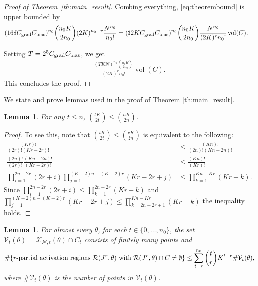 \documentclass{article}
\newtheorem{lemma}[theorem]{Lemma}
\theoremstyle{definition}
\newcommand{\cbias}{C_{\text{\normalfont bias}}}
\newcommand{\cgrad}{C_{\text{\normalfont grad}}}
\newcommand{\nin}{n_0}
\newcommand{\vol}{\operatorname{vol}}
\begin{document}
\begin{proof}[Proof of Theorem~\ref{th:main_result}]
   Combing everything, \eqref{eq:theorembound} is upper bounded by
   \begin{align*}
        &(16 \delta \cgrad \cbias)^{\nin} \binom{\nin K}{2 \nin}  (2 K) ^{\nin - r} \frac{N^{\nin}}{\nin!} = (32 K \cgrad \cbias)^{\nin} \binom{\nin K}{2 \nin}  \frac{N^{\nin}}{ (2 K)^r \nin!} \vol(C).
   \end{align*}
   
   Setting $T
   = 2^5 \cgrad \cbias$, we get
    \begin{align*}
        \frac{(T K N )^{\nin} \binom{\nin K}{2 \nin} } {(2 K)^r \nin!} \vol(C).
    \end{align*}
This concludes the proof. 
\end{proof}

We state and prove lemmas used in the proof of Theorem \ref{th:main_result}. 
\begin{lemma}
    \label{lem:technical1}
    For any $t \leq n$, $\binom{tK}{2t} \leq \binom{nK}{2n}$. 
\end{lemma}
\begin{proof}
To see this, note that $\binom{tK}{2t} \leq \binom{nK}{2n}$ is equivalent to  the following: 
    \begin{align*}
        \frac{(Kr)!}{(2r)!(Kr - 2r)!} &\leq \frac{(Kn)!}{(2n)!(Kn - 2n)!}\\
        \frac{(2n)!}{(2r)!} \frac{(Kn - 2n)!}{(Kr - 2r)!}  &\leq  \frac{(Kn)!}{(Kr)!}\\
        \prod_{i=1}^{2n - 2r} (2r + i) \prod_{j=1}^{(K-2)n - (K-2) r} (Kr - 2r + j) &\leq \prod_{k=1}^{Kn - Kr} (Kr + k). 
    \end{align*}
    Since $\prod_{i=1}^{2n - 2r} (2r + i) \leq \prod_{k=1}^{2n - 2r} (Kr + k)$ and $\prod_{j=1}^{(K-2)n - (K-2) r} (Kr - 2r + j) \leq \prod_{k=2n - 2r + 1}^{Kn - Kr} (Kr + k)$ the inequality holds. 
\end{proof}

\begin{lemma}
    \label{lem:intersection_upper_bound}
    For almost every $\theta$, for each $t\in\{0,\ldots, \nin\}$, the set $\mathcal{V}_t(\theta) = \mathcal{X}_{\mathcal{N},t}(\theta)\cap C_t$ consists of finitely many points and  
    \begin{align}
            \# \{ r\text{\normalfont -partial activation regions } \mathcal{R}(J^r,\theta)
            \text{ \normalfont with } \mathcal{R}(J^r,\theta) \cap C \neq \emptyset \} \leq \sum\limits_{t=r}^{\nin} \binom{t}{r} K^{t-r} \# \mathcal{V}_t(\theta),
        \label{eq:rpart_with_v}
    \end{align}
    where $\# \mathcal{V}_t(\theta)$ is the number of points in $\mathcal{V}_t(\theta)$. 
\end{lemma}
\end{document}
